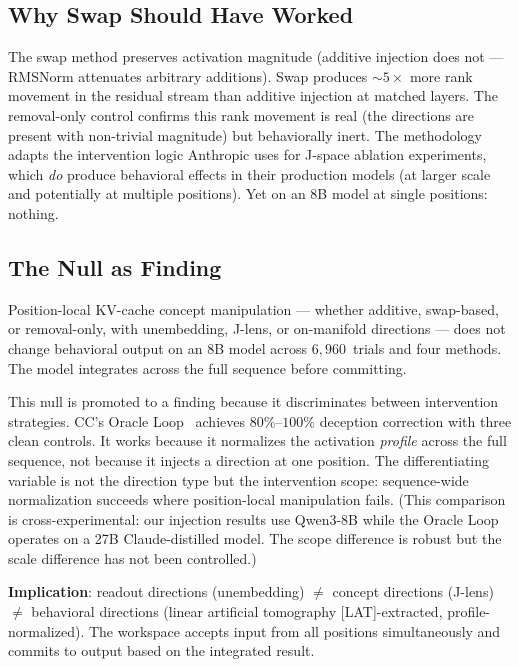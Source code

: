 \documentclass[11pt,a4paper]{article}
\begin{document}
\subsection{Why Swap Should Have Worked}

The swap method preserves activation magnitude (additive injection does
not --- RMSNorm attenuates arbitrary additions). Swap produces
${\sim}5\times$ more rank movement in the residual stream than additive
injection at matched layers. The removal-only control confirms this
rank movement is real (the directions are present with non-trivial
magnitude) but behaviorally inert. The methodology adapts the
intervention logic Anthropic uses for J-space ablation experiments,
which \emph{do} produce behavioral effects in their production
models (at larger scale and potentially at multiple positions). Yet on an 8B
model at single positions: nothing.

\subsection{The Null as Finding}

Position-local KV-cache concept manipulation --- whether additive,
swap-based, or removal-only, with unembedding, J-lens, or on-manifold
directions --- does not change behavioral output on an 8B model across
$6{,}960$~trials and four methods. The model integrates across the full
sequence before committing.

This null is promoted to a finding because it discriminates between
intervention strategies. CC's Oracle Loop~\citep{lyra2026oracle}
achieves $80\%$--$100\%$ deception correction with three clean controls.
It works because it normalizes the activation \emph{profile} across the
full sequence, not because it injects a direction at one position. The
differentiating variable is not the direction type but the intervention
scope: sequence-wide normalization succeeds where position-local
manipulation fails. (This comparison is cross-experimental: our
injection results use Qwen3-8B while the Oracle Loop operates on
a 27B Claude-distilled model. The scope difference is robust but the
scale difference has not been controlled.)

\textbf{Implication}: readout directions (unembedding) $\neq$ concept
directions (J-lens) $\neq$ behavioral directions (linear artificial
tomography [LAT]-extracted,
profile-normalized). The workspace accepts input from all positions
simultaneously and commits to output based on the integrated result.
\end{document}
